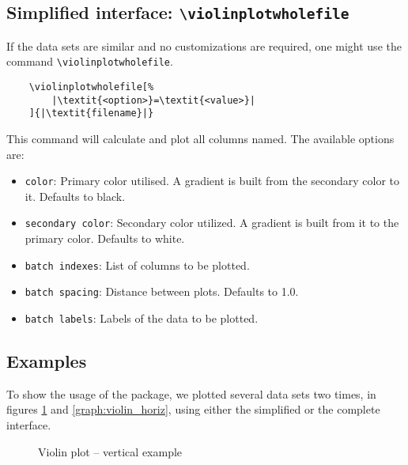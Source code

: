 \documentclass{article}
\begin{document}
\subsection{Simplified interface: \texttt{{\textbackslash}violinplotwholefile}}

If the data sets are similar and no customizations are required, one might
use the command \texttt{{\textbackslash}violinplotwholefile}.

\begin{verbatim}
	\violinplotwholefile[%
		|\textit{<option>}=\textit{<value>}|
	]{|\textit{filename}|}
\end{verbatim}

This command will calculate and plot all columns named. The available options
are:

\begin{itemize}
	\item \texttt{color}: Primary color utilised. A gradient is built from
		the secondary color to it. Defaults to black.
	\item \texttt{secondary color}: Secondary color utilized. A
		gradient is built from it to the primary color. Defaults
		to white.
	\item \texttt{batch indexes}: List of columns to be plotted.
	\item \texttt{batch spacing}: Distance between plots. Defaults to 1.0.
	\item \texttt{batch labels}: Labels of the data to be plotted.
\end{itemize}

\subsection{Examples}

To show the usage of the package, we plotted several data sets two times, in
figures \ref{graph:violin_verti} and \ref{graph:violin_horiz}, using either the
simplified or the complete interface.

\begin{figure}[h]
	\centering
	\caption{Violin plot -- vertical example}
	\label{graph:violin_verti}
\end{figure}
\end{document}
